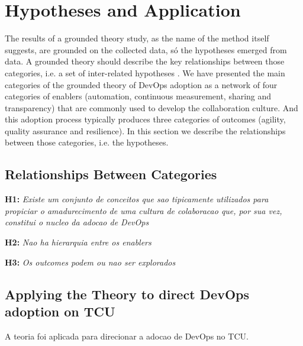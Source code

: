 \section{Hypotheses and Application}

The results of a grounded theory study, as the name of the method itself
suggests, are grounded on the collected data, só the hypotheses emerged from
data. A grounded theory should describe the key relationships between those
categories, i.e. a set of inter-related hypotheses \cite{hoda2017becoming}.
We have presented the main categories of the grounded theory of DevOps adoption
as a network of four categories of enablers (automation, continuous measurement,
sharing and transparency) that are commonly used to develop the collaboration
culture. And this adoption process typically produces three categories of
outcomes (agility, quality assurance and resilience). In this section we
describe the relationships between those categories, i.e. the hypotheses.

\subsection{Relationships Between Categories}

\textbf{H1:} \textit{Existe um conjunto de conceitos que sao tipicamente
utilizados para propiciar o amadurecimento de uma cultura de colaboracao que,
por sua vez, constitui o nucleo da adocao de DevOps}

\textbf{H2:} \textit{Nao ha hierarquia entre os enablers}

\textbf{H3:} \textit{Os outcomes podem ou nao ser explorados}

\subsection{Applying the Theory to direct DevOps adoption on TCU}
A teoria foi aplicada para direcionar a adocao de DevOps no TCU.
